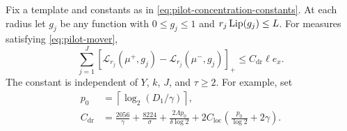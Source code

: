 \begin{lemma}
\label{lem:pilot-drift}
Fix a template and constants as in
\eqref{eq:pilot-concentration-constants}.  At each radius let $g_j$ be
any function with $0\le g_j\le1$ and $r_j\operatorname{Lip}(g_j)\le L$.
For measures satisfying \eqref{eq:pilot-mover},
\begin{equation}
 \sum_{j=1}^J
 [\mathcal L_{r_j}(\mu^+,g_j)
        -\mathcal L_{r_j}(\mu^-,g_j)]_+
 \le C_{\mathrm{dr}}\ell e_x.
 \label{eq:pilot-drift}
\end{equation}
The constant is independent of $Y$, $k$, $J$, and $\tau\ge2$.
For example, set
\begin{align}
 p_0&=\left\lceil\log_2(D_1/\gamma)\right\rceil,\nonumber\\
 C_{\mathrm{dr}}
   &=\frac{2056}{\gamma}+\frac{8224}{\sigma}
       +\frac{2\Lambda p_0}{\delta\log2}
       +2C_{\mathrm{loc}}
                   \left(\frac{p_0}{\log2}+2\gamma\right).
 \label{eq:pilot-drift-constant}
\end{align}
\end{lemma}

